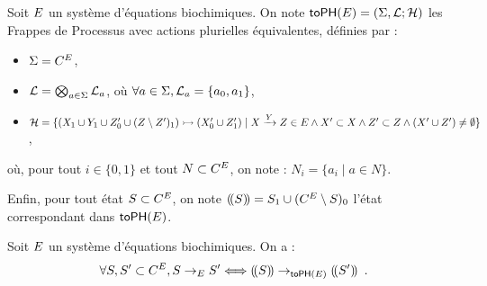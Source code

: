 \begin{definition}
  Soit $E$ un système d'équations biochimiques.
  On note $\mathsf{toPH}(E) = (\Sigma, \mathcal{L}; \mathcal{H})$ les Frappes de Processus avec actions plurielles
  équivalentes, définies par :
  \begin{itemize}
    \item $\Sigma = C^{E}$,
    \item $\mathcal{L} = \bigotimes_{a \in \Sigma} \mathcal{L}_a$, où $\forall a \in \Sigma, \mathcal{L}_a = \{ a_0, a_1 \}$,
    \item $\mathcal{H} = \{
      \mbox{$(X_1 \cup Y_1 \cup Z'_0 \cup (Z \setminus Z')_1) \rightarrowtail (X'_0 \cup Z'_1)$} \mid
      X \xrightarrow{Y} Z \in E \wedge X' \subset X \wedge Z' \subset Z \wedge
      (X' \cup Z') \neq \emptyset \}$,
%     
%     
  \end{itemize}
  où, pour tout $i \in \{ 0, 1 \}$ et tout $N \subset C^{E}$, on note :
  $N_i = \{ a_i \mid a \in N \}$.
  
  Enfin, pour tout état $S \subset C^{E}$, on note
  $(\!(S)\!) = S_1 \cup (C^{E} \setminus S)_0$
  l'état correspondant dans $\mathsf{toPH}(E)$.
\end{definition}

\begin{theorem}[$\PH \approx \bctophm$]
  Soit $E$ un système d'équations biochimiques.
  On a :
  \[\forall S, S' \subset C^{E}, S \rightarrow_{E} S' \Longleftrightarrow
    (\!(S)\!) \rightarrow_{\mathsf{toPH}(E)} (\!(S')\!) \enspace.\]
\end{theorem}

